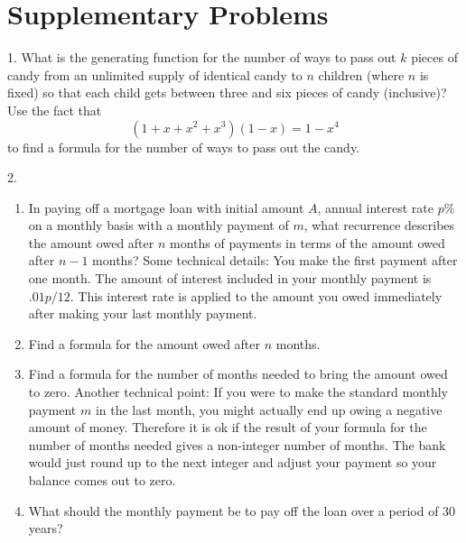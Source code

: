 \documentclass[10pt,]{book}
\theoremstyle{plain}
\theoremstyle{definition}
\theoremstyle{definition}
\numberwithin{equation}{chapter}
\newcommand{\importantarrow}{\Rightarrow}
\begin{document}
\section[{Supplementary Problems}]{Supplementary Problems}\label{sec_genfns-suppprobs}
\begin{exerciselist}
\item[1.]\marginsymbol[-1em]{\pdftooltip{$\importantarrow$\ $*$}{especially interesting and difficult}} \hypertarget{candy-genfn}{}What is the generating function for the number of ways to pass out \(k\) pieces of candy from an unlimited supply of identical candy to \(n\) children (where \(n\) is fixed) so that each child gets between three and six pieces of candy (inclusive)? Use the fact that%
\begin{equation*}
(1+x+x^2+x^3)(1-x) = 1-x^4
\end{equation*}
to find a formula for the number of ways to pass out the candy.%
\par\smallskip
\item[2.] \hypertarget{exercise-38}{}\leavevmode%
\begin{enumerate}[label=(\alph*)]
\item\hypertarget{li-76}{}In paying off a mortgage loan with initial amount \(A\), annual interest rate \(p\)\% on a monthly basis with a monthly payment of \(m\), what recurrence describes the amount owed after \(n\) months of payments in terms of the amount owed after \(n-1\) months?  Some technical details: You make the first payment after one month.  The amount of interest included in your monthly payment is \(.01p/12\).  This interest rate is applied to the amount you owed immediately after making your last monthly payment.%
\item\hypertarget{li-77}{}Find a formula for the amount owed after \(n\) months.%
\item\hypertarget{li-78}{}Find a formula for the number of months needed to bring the amount owed to zero.  Another technical point: If you were to make the standard monthly payment \(m\) in the last month, you might actually end up owing a negative amount of money.  Therefore it is ok if the result of your formula for the number of months needed gives a non-integer number of months.  The bank would just round up to the next integer and adjust your payment so your balance comes out to zero.%
\item\hypertarget{li-79}{}What should the monthly payment be to pay off the loan over a period of 30 years?%

\end{enumerate}
\end{exerciselist}
\end{document}
